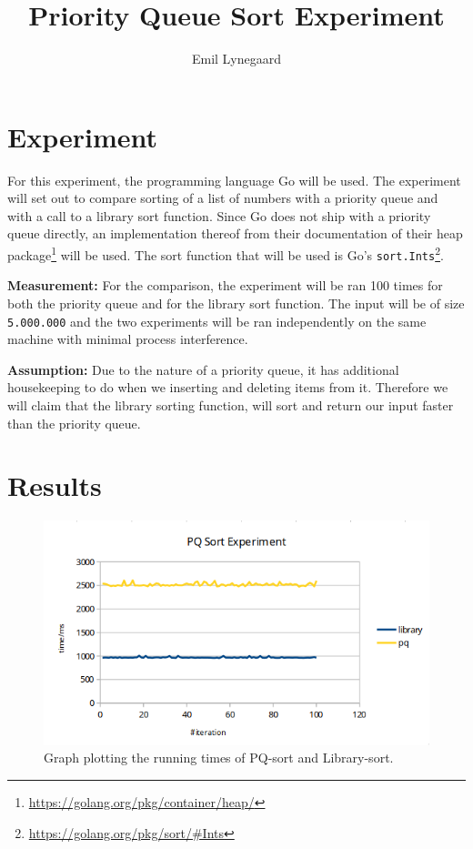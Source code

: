 \documentclass[a5paper]{article}
\title{Priority Queue Sort Experiment}
\author{Emil Lynegaard}
\begin{document}
  \maketitle
  \section{Experiment}
  For this experiment, the programming language Go will be used. The experiment will set out to compare sorting of a list of numbers with a priority queue and with a call to a library sort function. Since Go does not ship with a priority queue directly, an implementation thereof from their documentation of their heap package\footnote{\url{https://golang.org/pkg/container/heap/}} will be used. The sort function that will be used is Go's \texttt{sort.Ints}\footnote{\url{https://golang.org/pkg/sort/\#Ints}}.

\textbf{Measurement:} For the comparison, the experiment will be ran 100 times for both the priority queue and for the library sort function. The input will be of size \texttt{5.000.000} and the two experiments will be ran independently on the same machine with minimal process interference.

\textbf{Assumption:} Due to the nature of a priority queue, it has additional housekeeping to do when we inserting and deleting items from it. Therefore we will claim that the library sorting function, will sort and return our input faster than the priority queue.

\section{Results}
\begin{figure}[!ht]
    \centering
    \noindent\includegraphics[scale=0.6]{graph.png}
    \caption{Graph plotting the running times of PQ-sort and Library-sort.}
    \label{fig:graph}
\end{figure}
\end{document}
